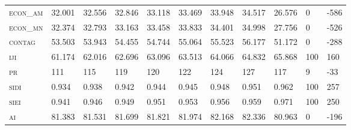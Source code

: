 \begin{landscape}
\begin{table}[!htbp]
\begin{tabular}{@{}llllllll|lll@{}}
\small \textsc{econ\_am}        & 32.001   & 32.556   & 32.846   & 33.118   & 33.469   & 33.948   & 34.517     & 26.576        & 0               & -586 \\
\small \textsc{econ\_mn}        & 32.374   & 32.793   & 33.163   & 33.458   & 33.833   & 34.401   & 34.998     & 27.756        & 0               & -526 \\
\small \textsc{contag}          & 53.503   & 53.943   & 54.455   & 54.744   & 55.064   & 55.523   & 56.177     & 51.172        & 0               & -288 \\
\small \textsc{iji }            & 61.174   & 62.016   & 62.696   & 63.096   & 63.513   & 64.066   & 64.832     & 65.868        & 100             & 160  \\
\small \textsc{pr}              & 111      & 115      & 119      & 120      & 122      & 124      & 127        & 117           & 9               & -33  \\
\small \textsc{sidi}            & 0.934    & 0.938    & 0.942    & 0.944    & 0.945    & 0.948    & 0.951      & 0.962         & 100             & 257  \\
\small \textsc{siei}            & 0.941    & 0.946    & 0.949    & 0.951    & 0.953    & 0.956    & 0.959      & 0.971         & 100             & 250  \\
\small \textsc{ai}              & 81.383   & 81.531   & 81.699   & 81.821   & 81.974   & 82.168   & 82.336     & 80.963        & 0               & -196 \\ \bottomrule
\end{tabular}
\end{table}
\end{landscape}
